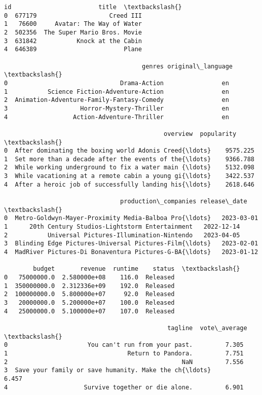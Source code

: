 \documentclass[11pt]{article}
\makeatletter
\newcommand{\boxspacing}{\kern\kvtcb@left@rule\kern\kvtcb@boxsep}
\newcommand{\prompt}[4]{
        {\ttfamily\llap{{\color{#2}[#3]:\hspace{3pt}#4}}\vspace{-\baselineskip}}
    }
\makeatother
\begin{document}
            \begin{tcolorbox}[breakable, size=fbox, boxrule=.5pt, pad at break*=1mm, opacityfill=0]
\prompt{Out}{outcolor}{ }{\boxspacing}
\begin{Verbatim}[commandchars=\\\{\}]
       id                        title  \textbackslash{}
0  677179                    Creed III
1   76600     Avatar: The Way of Water
2  502356  The Super Mario Bros. Movie
3  631842           Knock at the Cabin
4  646389                        Plane

                                      genres original\_language  \textbackslash{}
0                               Drama-Action                en
1           Science Fiction-Adventure-Action                en
2  Animation-Adventure-Family-Fantasy-Comedy                en
3                    Horror-Mystery-Thriller                en
4                  Action-Adventure-Thriller                en

                                            overview  popularity  \textbackslash{}
0  After dominating the boxing world Adonis Creed{\ldots}    9575.225
1  Set more than a decade after the events of the{\ldots}    9366.788
2  While working underground to fix a water main {\ldots}    5132.098
3  While vacationing at a remote cabin a young gi{\ldots}    3422.537
4  After a heroic job of successfully landing his{\ldots}    2618.646

                                production\_companies release\_date  \textbackslash{}
0  Metro-Goldwyn-Mayer-Proximity Media-Balboa Pro{\ldots}   2023-03-01
1      20th Century Studios-Lightstorm Entertainment   2022-12-14
2           Universal Pictures-Illumination-Nintendo   2023-04-05
3  Blinding Edge Pictures-Universal Pictures-Film{\ldots}   2023-02-01
4  MadRiver Pictures-Di Bonaventura Pictures-G-BA{\ldots}   2023-01-12

        budget       revenue  runtime    status  \textbackslash{}
0   75000000.0  2.580000e+08    116.0  Released
1  350000000.0  2.312336e+09    192.0  Released
2  100000000.0  5.800000e+07     92.0  Released
3   20000000.0  5.200000e+07    100.0  Released
4   25000000.0  5.100000e+07    107.0  Released

                                             tagline  vote\_average  \textbackslash{}
0                      You can't run from your past.         7.305
1                                 Return to Pandora.         7.751
2                                                NaN         7.556
3  Save your family or save humanity. Make the ch{\ldots}         6.457
4                     Survive together or die alone.         6.901


\end{Verbatim}
\end{tcolorbox}
\end{document}

